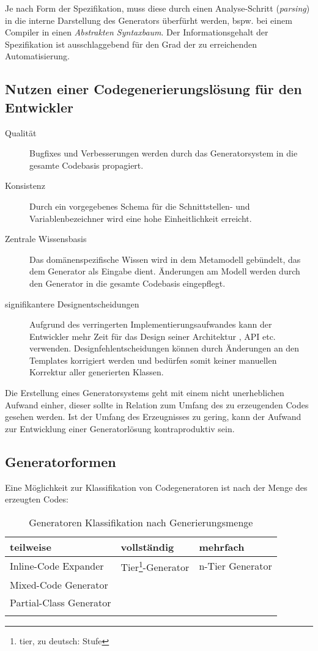 Je nach Form der Spezifikation, muss diese durch einen Analyse-Schritt (\emph{parsing}) in die interne Darstellung des Generators überfürht werden, bspw. bei einem Compiler in einen \emph{Abstrakten Syntaxbaum}.
Der Informationsgehalt der Spezifikation ist ausschlaggebend für den Grad der zu erreichenden Automatisierung.

\subsection{Nutzen einer Codegenerierungslösung für den Entwickler\cite{herrington2003code}}

\begin{description}
    \item[Qualität]
        Bugfixes und Verbesserungen werden durch das Generatorsystem in die gesamte Codebasis propagiert.
    \item[Konsistenz]
        Durch ein vorgegebenes Schema für die Schnittstellen- und Variablenbezeichner wird eine hohe Einheitlichkeit erreicht.
    \item[Zentrale Wissensbasis]
        Das domänenspezifische Wissen wird in dem Metamodell gebündelt, das dem Generator als Eingabe dient. Änderungen am Modell werden durch den Generator in die gesamte Codebasis eingepflegt.
    \item[signifikantere Designentscheidungen]
        Aufgrund des verringerten Implementierungsaufwandes kann der Entwickler mehr Zeit für das Design seiner Architektur , API etc. verwenden. Designfehlentscheidungen können durch Änderungen an den Templates korrigiert werden und bedürfen somit keiner manuellen Korrektur aller generierten Klassen.
\end{description}

Die Erstellung eines Generatorsystems geht mit einem nicht unerheblichen Aufwand einher, dieser sollte in Relation zum Umfang des zu erzeugenden Codes gesehen werden.
Ist der Umfang des Erzeugnisses zu gering, kann der Aufwand zur Entwicklung einer Generatorlösung kontraproduktiv sein.

\subsection{Generatorformen}

Eine Möglichkeit zur Klassifikation von Codegeneratoren ist nach der Menge des erzeugten Codes:

\begin{longtable}[htb]{l l l}
    \toprule
    \rowcolor{lightgray}
    \textbf{teilweise}   & \textbf{vollständig}     & \textbf{mehrfach}\\
    \midrule
    Inline-Code Expander    & Tier\footnote{tier, zu deutsch: Stufe}-Generator    & n-Tier Generator\\
    Mixed-Code Generator & &\\
    Partial-Class Generator & & \\
    \bottomrule
    \caption{Generatoren Klassifikation nach Generierungsmenge}
    \label{tab:generatorclassification}
\end{longtable} 

